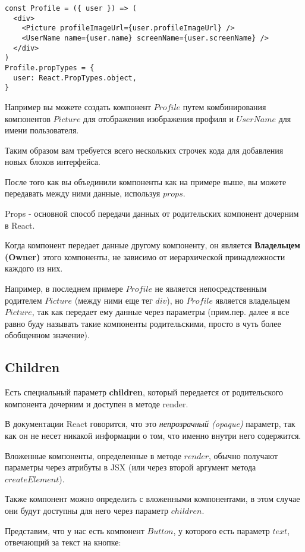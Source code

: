 \begin{lstlisting}
const Profile = ({ user }) => (
  <div>
    <Picture profileImageUrl={user.profileImageUrl} />
    <UserName name={user.name} screenName={user.screenName} />
  </div>
)
Profile.propTypes = {
  user: React.PropTypes.object,
}	
\end{lstlisting}

Например вы можете создать компонент $Profile$ путем комбинирования компонентов $Picture$ для отображения изображения профиля и $UserName$ для имени пользователя.

Таким образом вам требуется всего нескольких строчек кода для добавления новых блоков интерфейса.

После того как вы объединили компоненты как на примере выше, вы можете передавать между ними данные, используя $props$.

Props - основной способ передачи данных от родительских компонент дочерним в React. 

Когда компонент передает данные другому компоненту, он является \textbf{Владельцем (Owner)} этого компоненты, не зависимо от иерархической принадлежности каждого из них.

Например, в последнем примере $Profile$ не является непосредственным родителем $Picture$ (между ними еще тег $div$), но $Profile$ является владельцем $Picture$, так как передает ему данные через параметры (прим.пер. далее я все равно буду называть такие компоненты родительскими, просто в чуть более обобщенном значение).


\subsection{Children}

Есть специальный параметр \textbf{children}, который передается от родительского компонента дочерним и доступен в методе render.

В документации React говорится, что это \textit{непрозрачный (opaque)} параметр, так как он не несет никакой информации о том, что именно внутри него содержится.

Вложенные компоненты, определенные в методе $render$, обычно получают параметры через атрибуты в JSX (или через второй аргумент метода $createElement$).

Также компонент можно определить с вложенными компонентами, в этом случае они будут доступны для него через параметр $children$.

Представим, что у нас есть компонент $Button$, у которого есть параметр $text$, отвечающий за текст на кнопке:


